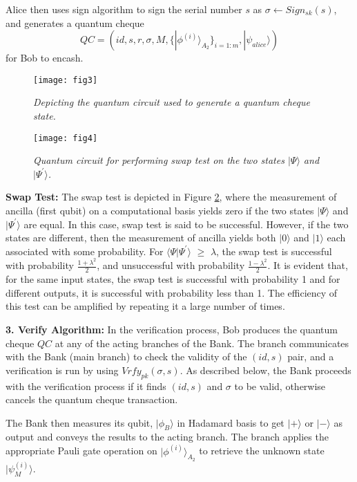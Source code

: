 \documentclass[aps,pra,twocolumn,groupedaddress,showpacs,showkeys]{revtex4-1}
\begin{document}
Alice then uses sign algorithm to sign the serial number $s$ as $\sigma \leftarrow Sign_{sk}(s)$, and generates a quantum cheque $$ QC = (id, s,  r, \sigma, M, \{|\phi^{(i)}\rangle_{A_2}\}_{i=1:m}, |\psi_{alice}\rangle )$$ for Bob to encash.

\begin{figure}[h]
    \centering
    \texttt{[image: fig3]}
    \caption{\emph{Depicting the quantum circuit used to generate a quantum cheque state.}}
    \label{fig:III}
\end{figure}

\begin{figure}[h]
    \centering
    \texttt{[image: fig4]}
    \caption{\emph{Quantum circuit for performing swap test on the two states $|\Psi\rangle$ and $|\Psi^{\prime}\rangle$.}}
    \label{fig:IV}
\end{figure}

\textbf{Swap Test:}
The swap test is depicted in Figure \ref{fig:IV}, where the measurement of ancilla (first qubit) on a computational basis yields zero if the two states $|\Psi\rangle$ and $|\Psi^{\prime}\rangle$ are equal. In this case, swap test is said to be successful. However, if the two states are different, then the measurement of ancilla yields both $|0\rangle$ and $|1\rangle$ each associated with some probability. For $\langle \Psi|\Psi^{\prime}\rangle$ $\geq$ $\lambda$, the swap test is successful with probability $\frac{1+\lambda^2}{2}$, and unsuccessful with probability $\frac{1-\lambda^2}{2}$. It is evident that, for the same input states, the swap test is successful with probability 1 and for different outputs, it is successful with probability less than 1. The efficiency of this test can be amplified by repeating it a large number of times. 

\textbf{3. Verify Algorithm:}
In the verification process, Bob produces the quantum cheque $QC$ at any of the acting branches of the Bank. The branch communicates with the Bank (main branch) to check the validity of the $(id,s)$ pair, and a verification is run by using $Vrfy_{pk}(\sigma, s)$. As described below, the Bank proceeds with the verification process if it finds $(id,s)$ and $\sigma$ to be valid, otherwise cancels the quantum cheque transaction. 

The Bank then measures its qubit, $|\phi_{B}\rangle$ in Hadamard basis to get $|+\rangle$ or $|-\rangle$ as output and conveys the results to the acting branch. The branch applies the appropriate Pauli gate operation on $|\phi^{(i)}\rangle_{A_2}$ to retrieve the unknown state $|\psi_M ^{(i)}\rangle $.
\end{document}

